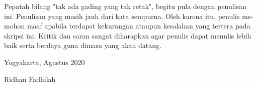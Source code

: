 Pepatah bilang "tak ada gading yang tak retak", begitu pula dengan penulisan ini. Penulisan yang masih jauh dari kata sempurna. Oleh karena itu, penulis me-mohon maaf apabila terdapat kekurangan ataupun kesalahan yang tertera pada skripsi ini. Kritik dan saran sangat diharapkan agar penulis dapat menulis lebih baik serta berdaya guna dimasa yang akan datang.
\newline

\begin{flushright}
Yogyakarta, Agustus 2020
\end{flushright}
\vspace{0.5cm}
\begin{flushright}
Ridhan Fadhilah
\end{flushright}